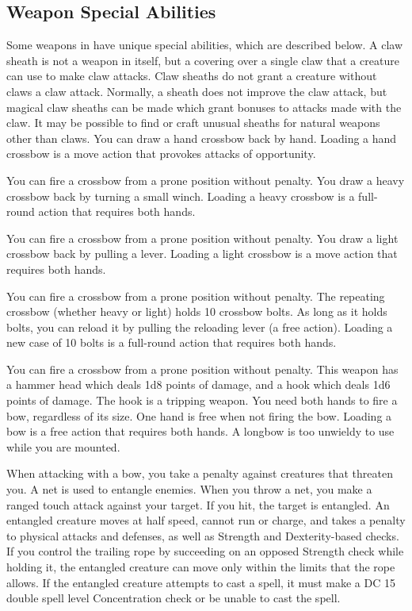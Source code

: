 \subsection{Weapon Special Abilities}
Some weapons in  have unique special abilities, which are described below.
 A claw sheath is not a weapon in itself, but a covering over a single claw that a creature can use to make claw attacks. Claw sheaths do not grant a creature without claws a claw attack. Normally, a sheath does not improve the claw attack, but magical claw sheaths can be made which grant bonuses to attacks made with the claw. It may be possible to find or craft unusual sheaths for natural weapons other than claws.
 You can draw a hand crossbow back by hand. Loading a hand crossbow is a move action that provokes attacks of opportunity.
\par You can fire a crossbow from a prone position without penalty.
 You draw a heavy crossbow back by turning a small winch. Loading a heavy crossbow is a full-round action that requires both hands.
\par You can fire a crossbow from a prone position without penalty.
 You draw a light crossbow back by pulling a lever. Loading a light crossbow is a move action that requires both hands.
\par You can fire a crossbow from a prone position without penalty.
 The repeating crossbow (whether heavy or light) holds 10 crossbow bolts. As long as it holds bolts, you can reload it by pulling the reloading lever (a free action). Loading a new case of 10 bolts is a full-round action that requires both hands.
\par You can fire a crossbow from a prone position without penalty.
 This weapon has a hammer head which deals 1d8 points of damage, and a hook which deals 1d6 points of damage. The hook is a tripping weapon.
 You need both hands to fire a bow, regardless of its size. One hand is free when not firing the bow. Loading a bow is a free action that requires both hands. A longbow is too unwieldy to use while you are mounted.
\par When attacking with a bow, you take a  penalty against creatures that threaten you.
 A net is used to entangle enemies. When you throw a net, you make a ranged touch attack against your target. If you hit, the target is entangled. An entangled creature moves at half speed, cannot run or charge, and takes a  penalty to physical attacks and defenses, as well as Strength and Dexterity-based checks. If you control the trailing rope by succeeding on an opposed Strength check while holding it, the entangled creature can move only within the limits that the rope allows. If the entangled creature attempts to cast a spell, it must make a DC 15 \add double spell level Concentration check or be unable to cast the spell.
